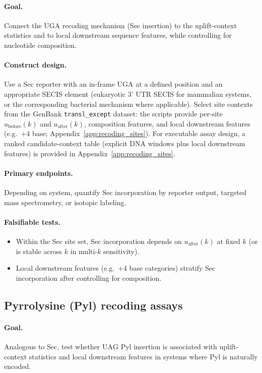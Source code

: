 \paragraph{Goal.}
Connect the $\mathrm{UGA}$ recoding mechanism (Sec insertion) to the uplift-context statistics and to local downstream sequence features, while controlling for nucleotide composition.

\paragraph{Construct design.}
Use a Sec reporter with an in-frame $\mathrm{UGA}$ at a defined position and an appropriate SECIS element (eukaryotic 3' UTR SECIS for mammalian systems, or the corresponding bacterial mechanism where applicable).
Select site contexts from the GenBank \texttt{transl\_except} dataset:
the scripts provide per-site $u_{\mathrm{before}}(k)$ and $u_{\mathrm{after}}(k)$, composition features, and local downstream features (e.g.\ +4 base; Appendix~\ref{app:recoding_sites}).
For executable assay design, a ranked candidate-context table (explicit DNA windows plus local downstream features) is provided in Appendix~\ref{app:recoding_sites}.

\paragraph{Primary endpoints.}
Depending on system, quantify Sec incorporation by reporter output, targeted mass spectrometry, or isotopic labeling.

\paragraph{Falsifiable tests.}
\begin{itemize}
\item Within the Sec site set, Sec incorporation depends on $u_{\mathrm{after}}(k)$ at fixed $k$ (or is stable across $k$ in multi-$k$ sensitivity).
\item Local downstream features (e.g.\ +4 base categories) stratify Sec incorporation after controlling for composition.
\end{itemize}

\subsection{Pyrrolysine (Pyl) recoding assays}
\label{app:bio_validation_pyl}

\paragraph{Goal.}
Analogous to Sec, test whether $\mathrm{UAG}$ Pyl insertion is associated with uplift-context statistics and local downstream features in systems where Pyl is naturally encoded.

